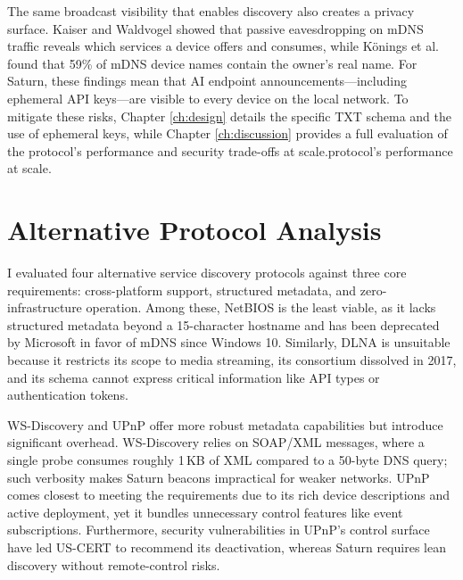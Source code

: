 The same broadcast visibility that enables discovery also creates a privacy surface. Kaiser and Waldvogel \cite{kaiser2014privacy} showed that passive eavesdropping on mDNS traffic reveals which services a device offers and consumes, while Könings et al. \cite{konings2013devicenames} found that 59\% of mDNS device names contain the owner's real name. For Saturn, these findings mean that AI endpoint announcements—including ephemeral API keys—are visible to every device on the local network. To mitigate these risks, Chapter \ref{ch:design} details the specific TXT schema and the use of ephemeral keys, while Chapter \ref{ch:discussion} provides a full evaluation of the protocol's performance and security trade-offs at scale.protocol's performance at scale.

\section{Alternative Protocol Analysis}
\label{sec:comparisons}

I evaluated four alternative service discovery protocols against three core requirements: cross-platform support, structured metadata, and zero-infrastructure operation. Among these, NetBIOS \cite{rfc1001} is the least viable, as it lacks structured metadata beyond a 15-character hostname and has been deprecated by Microsoft in favor of mDNS since Windows 10. Similarly, DLNA \cite{dlna2017} is unsuitable because it restricts its scope to media streaming, its consortium dissolved in 2017, and its schema cannot express critical information like API types or authentication tokens.

WS-Discovery \cite{wsdiscovery} and UPnP \cite{upnp2015} offer more robust metadata capabilities but introduce significant overhead. WS-Discovery relies on SOAP/XML messages, where a single probe consumes roughly 1\,KB of XML compared to a 50-byte DNS query; such verbosity makes Saturn beacons impractical for weaker networks. UPnP comes closest to meeting the requirements due to its rich device descriptions and active deployment, yet it bundles unnecessary control features like event subscriptions. Furthermore, security vulnerabilities in UPnP's control surface have led US-CERT to recommend its deactivation, whereas Saturn requires lean discovery without remote-control risks.

